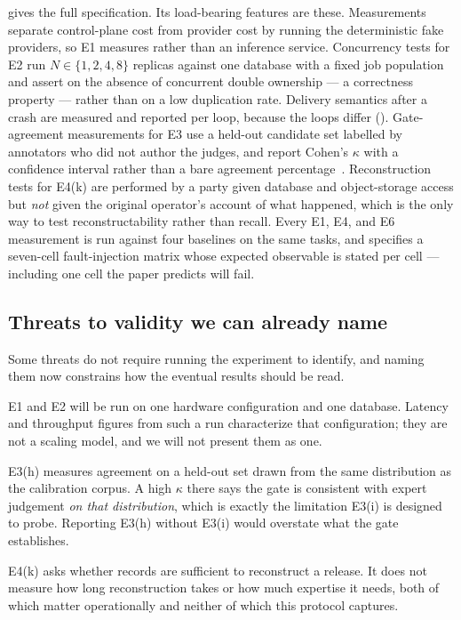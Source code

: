  gives the full specification. Its load-bearing features are
these. Measurements separate control-plane cost from provider cost by running the
deterministic fake providers, so E1 measures \sys rather than an inference service.
Concurrency tests for E2 run $N \in \{1, 2, 4, 8\}$ replicas against one database
with a fixed job population and assert on the absence of concurrent double
ownership --- a correctness property --- rather than on a low duplication rate.
Delivery semantics after a crash are measured and reported per loop, because the
loops differ (). Gate-agreement measurements for E3 use a held-out candidate
set labelled by annotators who did not author the judges, and report Cohen's
$\kappa$ with a confidence interval rather than a bare agreement
percentage~\cite{cohen1960kappa,fleiss1971kappa}. Reconstruction tests for E4(k)
are performed by a party given database and object-storage access but \emph{not}
given the original operator's account of what happened, which is the only way to
test reconstructability rather than recall. Every E1, E4, and E6 measurement is run
against four baselines on the same tasks, and  specifies a
seven-cell fault-injection matrix whose expected observable is stated per cell ---
including one cell the paper predicts \sys will fail.

\subsection{Threats to validity we can already name}

Some threats do not require running the experiment to identify, and naming them now
constrains how the eventual results should be read.

 E1 and E2
will be run on one hardware configuration and one database. Latency and throughput
figures from such a run characterize that configuration; they are not a scaling
model, and we will not present them as one.

 E3(h) measures agreement
on a held-out set drawn from the same distribution as the calibration corpus. A high
$\kappa$ there says the gate is consistent with expert judgement \emph{on that
distribution}, which is exactly the limitation E3(i) is designed to probe.
Reporting E3(h) without E3(i) would overstate what the gate establishes.

 E4(k) asks
whether records are sufficient to reconstruct a release. It does not measure how
long reconstruction takes or how much expertise it needs, both of which matter
operationally and neither of which this protocol captures.

